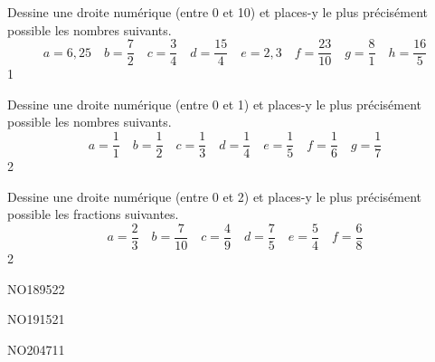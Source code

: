 \documentclass[a4paper,12pt]{report}
\begin{document}
\begin{exo}{
Dessine une droite numérique (entre 0 et 10) et places-y le plus précisément possible les nombres suivants.
\[
a=6,25 \quad b=\dfrac{7}{2} \quad c=\dfrac{3}{4} \quad d=\dfrac{15}{4} \quad e=2,3 \quad f=\dfrac{23}{10} \quad g=\dfrac{8}{1} \quad h=\dfrac{16}{5}
\]}
{1}\end{exo}

\begin{exo}{
Dessine une droite numérique (entre 0 et 1) et places-y le plus précisément possible les nombres suivants.
\[
a=\dfrac{1}{1} \quad b=\dfrac{1}{2} \quad c=\dfrac{1}{3} \quad d=\dfrac{1}{4} \quad e=\dfrac{1}{5} \quad f=\dfrac{1}{6} \quad g=\dfrac{1}{7}
\]}
{2}\end{exo}

\begin{exo}{
Dessine une droite numérique (entre 0 et 2) et places-y le plus précisément possible les fractions suivantes.
\[
a=\dfrac{2}{3} \quad b=\dfrac{7}{10} \quad c=\dfrac{4}{9} \quad d=\dfrac{7}{5} \quad e=\dfrac{5}{4} \quad f=\dfrac{6}{8}
\]}
{2}\end{exo}




\begin{exol}{NO189}{52}{2}
\end{exol}
\begin{exol}{NO191}{52}{1}
\end{exol}
\begin{exof}{NO204}{71}{1}
\end{exof}

\end{document}
